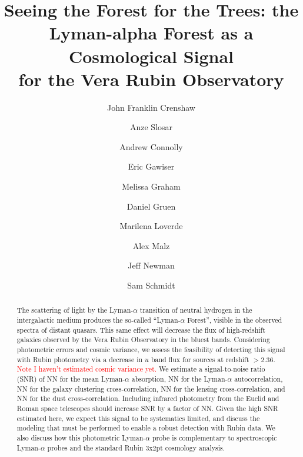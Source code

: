 \documentclass[twocolumn]{aastex631}
\newcommand{\note}[1]{\textsf{\textcolor{red}{#1}}\xspace}
\newcommand{\lya}{Lyman-$\alpha$\xspace}
\begin{document}
\title{Seeing the Forest for the Trees: the Lyman-alpha Forest as a Cosmological Signal\\for the Vera Rubin Observatory}


\author[0000-0002-2495-3514]{John Franklin Crenshaw}

\author{Anze Slosar} %
\affiliation{}

\author{Andrew Connolly} %
\affiliation{}

\author{Eric Gawiser} %
\affiliation{}

\author{Melissa Graham} %
\affiliation{}

\author{Daniel Gruen} %
\affiliation{}

\author{Marilena Loverde} %
\affiliation{}

\author{Alex Malz} %
\affiliation{}

\author{Jeff Newman} %
\affiliation{}

\author{Sam Schmidt} %
\affiliation{}



\begin{abstract}
    The scattering of light by the \lya transition of neutral hydrogen in the intergalactic medium produces the so-called ``\lya Forest'', visible in the observed spectra of distant quasars.
    This same effect will decrease the flux of high-redshift galaxies observed by the Vera Rubin Observatory in the bluest bands.
    Considering photometric errors and cosmic variance, we assess the feasibility of detecting this signal with Rubin photometry via a decrease in $u$ band flux for sources at redshift $> 2.36$.
    \note{Note I haven't estimated cosmic variance yet.}
    We estimate a signal-to-noise ratio (SNR) of NN for the mean \lya absorption, NN for the \lya autocorrelation, NN for the galaxy clustering cross-correlation, NN for the lensing cross-correlation, and NN for the dust cross-correlation.
    Including infrared photometry from the Euclid and Roman space telescopes should increase SNR by a factor of NN.
    Given the high SNR estimated here, we expect this signal to be systematics limited, and discuss the modeling that must be performed to enable a robust detection with Rubin data.
    We also discuss how this photometric \lya probe is complementary to spectroscopic \lya probes and the standard Rubin 3x2pt cosmology analysis.
\end{abstract}
\end{document}
